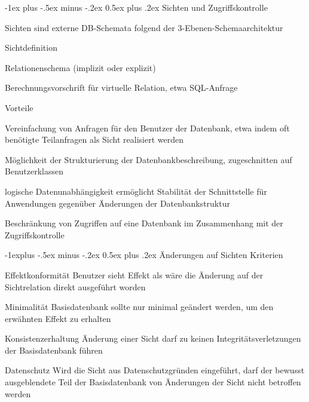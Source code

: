 \documentclass[a4paper]{article}
\makeatletter
\renewcommand{\section}{\@startsection{section}{1}{0mm}%
                                {-1ex plus -.5ex minus -.2ex}%
                                {0.5ex plus .2ex}%
                                {\normalfont\large\bfseries}}
\renewcommand{\subsection}{\@startsection{subsection}{2}{0mm}%
                                {-1explus -.5ex minus -.2ex}%
                                {0.5ex plus .2ex}%
                                {\normalfont\normalsize\bfseries}}
\makeatother
\begin{document}
\begin{multicols}{3}
    \section{Sichten und Zugriffskontrolle}
    \begin{itemize*}
        \item Sichten sind externe DB-Schemata folgend der 3-Ebenen-Schemaarchitektur
        \begin{itemize*}
            \item Sichtdefinition
            \item Relationenschema (implizit oder explizit)
            \item Berechnungsvorschrift für virtuelle Relation, etwa SQL-Anfrage
        \end{itemize*}
        \item Vorteile
        \begin{itemize*}
            \item Vereinfachung von Anfragen für den Benutzer der Datenbank, etwa indem oft benötigte Teilanfragen als Sicht realisiert werden
            \item Möglichkeit der Strukturierung der Datenbankbeschreibung, zugeschnitten auf Benutzerklassen
            \item logische Datenunabhängigkeit ermöglicht Stabilität der Schnittstelle für Anwendungen gegenüber Änderungen der Datenbankstruktur
            \item Beschränkung von Zugriffen auf eine Datenbank im Zusammenhang mit der Zugriffskontrolle
        \end{itemize*}
    \end{itemize*}

    \subsection{Änderungen auf Sichten}
    Kriterien
    \begin{description*}
        \item[Effektkonformität] Benutzer sieht Effekt als wäre die Änderung auf der Sichtrelation direkt ausgeführt worden
        \item[Minimalität] Basisdatenbank sollte nur minimal geändert werden, um den erwähnten Effekt zu erhalten
        \item[Konsistenzerhaltung] Änderung einer Sicht darf zu keinen Integritätsverletzungen der Basisdatenbank führen
        \item[Datenschutz] Wird die Sicht aus Datenschutzgründen eingeführt, darf der bewusst ausgeblendete Teil der Basisdatenbank von Änderungen der Sicht nicht betroffen werden
    \end{description*}


\end{multicols}
\end{document}
